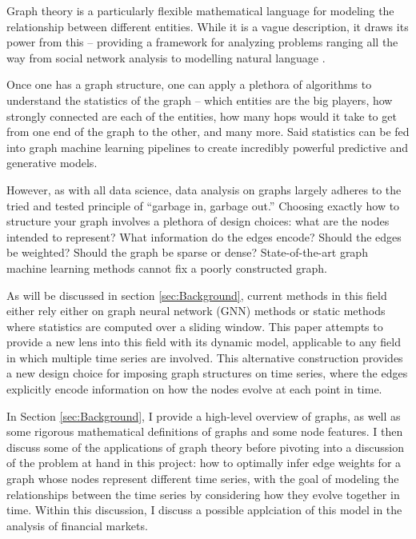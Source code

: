 \documentclass[12pt]{article}
\theoremstyle{definition}
\begin{document}
Graph theory is a particularly flexible mathematical language for modeling the relationship between different entities. While it is a vague description, it draws its power from this -- providing a framework for analyzing problems ranging all the way from social network analysis \cite{socialNetworkAnalysis} to modelling natural language \cite{speer2018conceptnet}. 

Once one has a graph structure, one can apply a plethora of algorithms to understand the statistics of the graph -- which entities are the big players, how strongly connected are each of the entities, how many hops would it take to get from one end of the graph to the other, and many more. Said statistics can be fed into graph machine learning pipelines to create incredibly powerful predictive and generative models.

However, as with all data science, data analysis on graphs largely adheres to the tried and tested principle of ``garbage in, garbage out.'' Choosing exactly how to structure your graph involves a plethora of design choices: what are the nodes intended to represent? What information do the edges encode? Should the edges be weighted? Should the graph be sparse or dense? State-of-the-art graph machine learning methods cannot fix a poorly constructed graph. 

As will be discussed in section \ref{sec:Background}, current methods in this field either rely either on graph neural network (GNN) methods or static methods where statistics are computed over a sliding window. This paper attempts to provide a new lens into this field with its dynamic model, applicable to any field in which multiple time series are involved. This alternative construction provides a new design choice for imposing graph structures on time series, where the edges explicitly encode information on how the nodes evolve at each point in time.

In Section \ref{sec:Background}, I provide a high-level overview of graphs, as well as some rigorous mathematical definitions of graphs and some node features. I then discuss some of the applications of graph theory before pivoting into a discussion of the problem at hand in this project: how to optimally infer edge weights for a graph whose nodes represent different time series, with the goal of modeling the relationships between the time series by considering how they evolve together in time. Within this discussion, I discuss a possible applciation of this model in the analysis of financial markets. 
\end{document}
